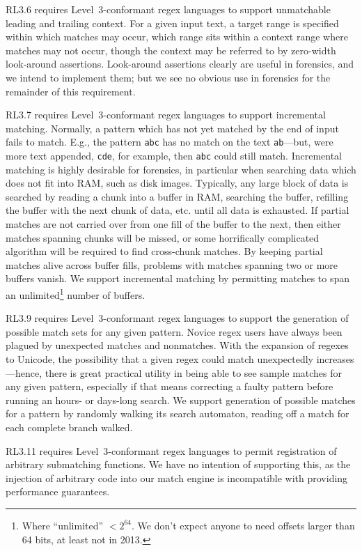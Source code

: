 \documentclass[5p,final,number,sort&compress]{elsarticle}
\newcommand{\re}[1]{\texttt{#1}}
\begin{document}
RL3.6 requires Level~3-conformant regex languages to support unmatchable leading and trailing context. For a given input text, a target range is specified within which matches may occur, which range sits within a context range where matches may not occur, though the context may be referred to by zero-width look-around assertions. Look-around assertions clearly are useful in forensics, and we intend to implement them; but we see no obvious use in forensics for the remainder of this requirement.

RL3.7 requires Level~3-conformant regex languages to support incremental matching. Normally, a pattern which has not yet matched by the end of input fails to match. E.g., the pattern \re{abc} has no match on the text \texttt{ab}---but, were more text appended, \texttt{cde}, for example, then \re{abc} could still match. Incremental matching is highly desirable for forensics, in particular when searching data which does not fit into RAM, such as disk images. Typically, any large block of data is searched by reading a chunk into a buffer in RAM, searching the buffer, refilling the buffer with the next chunk of data, etc. until all data is exhausted. If partial matches are not carried over from one fill of the buffer to the next, then either matches spanning chunks will be missed, or some horrifically complicated algorithm will be required to find cross-chunk matches. By keeping partial matches alive across buffer fills, problems with matches spanning two or more buffers vanish. We support incremental matching by permitting matches to span an unlimited\footnote{Where ``unlimited'' $< 2^{64}$. We don't expect anyone to need offsets larger than 64 bits, at least not in 2013.} number of buffers.

RL3.9 requires Level~3-conformant regex languages to support the generation of possible match sets for any given pattern. Novice regex users have always been plagued by unexpected matches and nonmatches. With the expansion of regexes to Unicode, the possibility that a given regex could match unexpectedly increases---hence, there is great practical utility in being able to see sample matches for any given pattern, especially if that means correcting a faulty pattern before running an hours- or days-long search. We support generation of possible matches for a pattern by randomly walking its search automaton, reading off a match for each complete branch walked.

RL3.11 requires Level~3-conformant regex languages to permit registration of arbitrary submatching functions. We have no intention of supporting this, as the injection of arbitrary code into our match engine is incompatible with providing performance guarantees.
\end{document}
